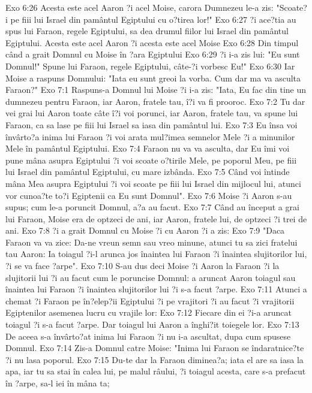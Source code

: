 Exo 6:26  Acesta este acel Aaron ?i acel Moise, carora Dumnezeu le-a zis: "Scoate?i pe fiii lui Israel din pamântul Egiptului cu o?tirea lor!"
Exo 6:27  ?i ace?tia au spus lui Faraon, regele Egiptului, sa dea drumul fiilor lui Israel din pamântul Egiptului. Acesta este acel Aaron ?i acesta este acel Moise
Exo 6:28  Din timpul când a grait Domnul cu Moise în ?ara Egiptului
Exo 6:29  ?i i-a zis lui: "Eu sunt Domnul!" Spune lui Faraon, regele Egiptului, câte-?i vorbesc Eu!"
Exo 6:30  Iar Moise a raspuns Domnului: "Iata eu sunt greoi la vorba. Cum dar ma va asculta Faraon?"
Exo 7:1  Raspuns-a Domnul lui Moise ?i i-a zis: "Iata, Eu fac din tine un dumnezeu pentru Faraon, iar Aaron, fratele tau, î?i va fi prooroc.
Exo 7:2  Tu dar vei grai lui Aaron toate câte î?i voi porunci, iar Aaron, fratele tau, va spune lui Faraon, ca sa lase pe fiii lui Israel sa iasa din pamântul lui.
Exo 7:3  Eu însa voi învârto?a inima lui Faraon ?i voi arata mul?imea semnelor Mele ?i a minunilor Mele în pamântul Egiptului.
Exo 7:4  Faraon nu va va asculta, dar Eu îmi voi pune mâna asupra Egiptului ?i voi scoate o?tirile Mele, pe poporul Meu, pe fiii lui Israel din pamântul Egiptului, cu mare izbânda.
Exo 7:5  Când voi întinde mâna Mea asupra Egiptului ?i voi scoate pe fiii lui Israel din mijlocul lui, atunci vor cunoa?te to?i Egiptenii ca Eu sunt Domnul".
Exo 7:6  Moise ?i Aaron s-au supus; cum le-a poruncit Domnul, a?a au facut.
Exo 7:7  Când au început a grai lui Faraon, Moise era de optzeci de ani, iar Aaron, fratele lui, de optzeci ?i trei de ani.
Exo 7:8  ?i a grait Domnul cu Moise ?i cu Aaron ?i a zis:
Exo 7:9  "Daca Faraon va va zice: Da-ne vreun semn sau vreo minune, atunci tu sa zici fratelui tau Aaron: Ia toiagul ?i-l arunca jos înaintea lui Faraon ?i înaintea slujitorilor lui, ?i se va face ?arpe".
Exo 7:10  S-au dus deci Moise ?i Aaron la Faraon ?i la slujitorii lui ?i au facut cum le poruncise Domnul: a aruncat Aaron toiagul sau înaintea lui Faraon ?i înaintea slujitorilor lui ?i s-a facut ?arpe.
Exo 7:11  Atunci a chemat ?i Faraon pe în?elep?ii Egiptului ?i pe vrajitori ?i au facut ?i vrajitorii Egiptenilor asemenea lucru cu vrajile lor:
Exo 7:12  Fiecare din ei ?i-a aruncat toiagul ?i s-a facut ?arpe. Dar toiagul lui Aaron a înghi?it toiegele lor.
Exo 7:13  De aceea s-a învârto?at inima lui Faraon ?i nu i-a ascultat, dupa cum spusese Domnul.
Exo 7:14  Zis-a Domnul catre Moise: "Inima lui Faraon se îndaratnice?te ?i nu lasa poporul.
Exo 7:15  Du-te dar la Faraon diminea?a; iata el are sa iasa la apa, iar tu sa stai în calea lui, pe malul râului, ?i toiagul acesta, care s-a prefacut în ?arpe, sa-l iei în mâna ta;
